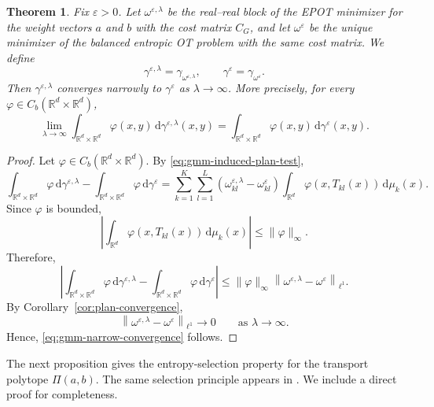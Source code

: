 \documentclass[a4paper,11pt]{article}
\numberwithin{equation}{section}
\newtheorem{thm}{Theorem}[section]
\newcommand{\eps}{\varepsilon}
\newcommand{\RR}{\mathbb{R}}
\newcommand{\dd}{\,\mathrm{d}}
\begin{document}
\begin{thm}\label{thm:gmm-narrow-lambda}
Fix $\eps>0$. Let $\omega^{\eps,\lambda}$ be the real--real block of the EPOT minimizer for the weight vectors $a$ and $b$ with the cost matrix $C_G$, and let $\omega^\eps$ be the unique minimizer of the balanced entropic OT problem with the same cost matrix. We define
\begin{equation}\label{eq:gamma-eps-lambda}
  \gamma^{\eps,\lambda}=\gamma_{\omega^{\eps,\lambda}},\qquad \gamma^\eps=\gamma_{\omega^\eps}.
\end{equation}
Then $\gamma^{\eps,\lambda}$ converges narrowly to $\gamma^\eps$ as $\lambda\to\infty$. More precisely, for every $\varphi\in C_b(\RR^d\times\RR^d)$,
\begin{equation}\label{eq:gmm-narrow-convergence}
  \lim_{\lambda\to\infty}
  \int_{\RR^d\times\RR^d}\varphi(x,y)\dd\gamma^{\eps,\lambda}(x,y) = \int_{\RR^d\times\RR^d}\varphi(x,y)\dd\gamma^\eps(x,y).
\end{equation}
\end{thm}

\begin{proof}
Let $\varphi\in C_b(\RR^d\times\RR^d)$. By \eqref{eq:gmm-induced-plan-test},
\begin{equation*}
  \int_{\RR^d\times\RR^d}\varphi\dd\gamma^{\eps,\lambda}-\int_{\RR^d\times\RR^d}\varphi\dd\gamma^\eps=\sum_{k=1}^{K}\sum_{l=1}^{L}\left(\omega^{\eps,\lambda}_{kl}-\omega^\eps_{kl}\right)\int_{\RR^d}\varphi(x,T_{kl}(x))\dd\mu_k(x).
\end{equation*}
Since $\varphi$ is bounded,
\begin{equation*}
  \left|
  \int_{\RR^d}\varphi(x,T_{kl}(x))\dd\mu_k(x)
  \right|
  \leq
  \|\varphi\|_{\infty}.
\end{equation*}
Therefore,
\begin{equation*}
  \left|\int_{\RR^d\times\RR^d}\varphi\dd\gamma^{\eps,\lambda}-\int_{\RR^d\times\RR^d}\varphi\dd\gamma^\eps\right|\leq \|\varphi\|_{\infty}\left\|\omega^{\eps,\lambda}-\omega^\eps\right\|_{\ell^1}.
\end{equation*}
By Corollary~\ref{cor:plan-convergence},
\begin{equation*}
  \left\|\omega^{\eps,\lambda}-\omega^\eps\right\|_{\ell^1}\to0\qquad\text{as }\lambda\to\infty.
\end{equation*}
Hence, \eqref{eq:gmm-narrow-convergence} follows.
\end{proof}

The next proposition gives the entropy-selection property for the transport polytope $\Pi(a,b)$. The same selection principle appears in \cite[Proposition~4.1]{cominetti1994asymptotic}. We include a direct proof for completeness.
\end{document}
